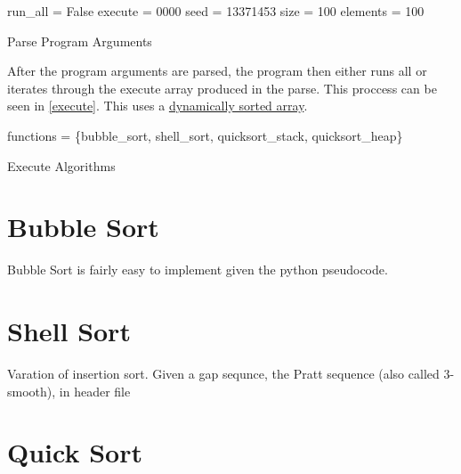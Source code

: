 \documentclass[12pt]{article}
\begin{document}
    \begin{algorithm}
        run\_all = False\;
		execute = 0000
        seed = 13371453
        size = 100
        elements = 100

        \caption{Parse Program Arguments}\label{parse}
    \end{algorithm}

    After the program arguments are parsed, the program then either runs all or iterates through the execute array produced in the parse. This proccess can be seen in \vref{execute}. 
    This uses a \href{https://www.geeksforgeeks.org/dynamic-memory-allocation-in-c-using-malloc-calloc-free-and-realloc/}{dynamically sorted array}.

    \begin{algorithm}
		functions = \{bubble\_sort, shell\_sort, quicksort\_stack, quicksort\_heap\}\;

        \caption{Execute Algorithms}\label{execute}
    \end{algorithm}

    \section{Bubble Sort}

    Bubble Sort is fairly easy to implement given the python pseudocode.

    \section{Shell Sort}

    Varation of insertion sort.
    Given a gap sequnce, the Pratt sequence (also called 3-smooth), in header file
    \section{Quick Sort}
\end{document}
